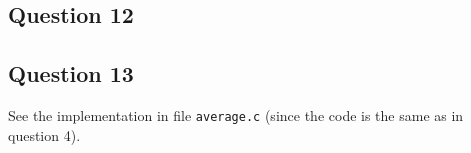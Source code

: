 
\subsection*{Question 12}


\subsection*{Question 13}

See the implementation in file \texttt{average.c} (since the code is the same as in question 4).




